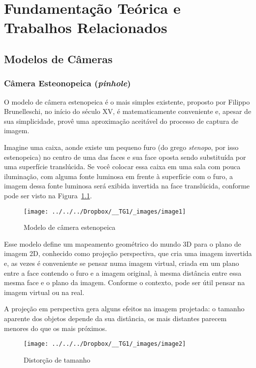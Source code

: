 \documentclass[ecp,tc]{iiufrgs}
\begin{document}
\chapter{Fundamentação Teórica e Trabalhos Relacionados}

\section{Modelos de Câmeras}

\subsection{Câmera Esteonopeica (\textit{pinhole})}
O  modelo  de  câmera  estenopeica  é  o  mais  simples  existente,  proposto  por  Filippo Brunelleschi, no início do século XV, é matematicamente conveniente e, apesar de sua simplicidade, provê uma aproximação aceitável do processo de captura de imagem.

Imagine uma caixa, aonde existe um pequeno furo (do grego \textit{stenopo}, por isso estenopeica) no centro de uma das faces e sua face oposta sendo substituída por uma superfície translúcida. Se você colocar essa caixa em uma sala com pouca iluminação, com alguma fonte luminosa em frente à superfície com o furo, a imagem dessa fonte luminosa será exibida invertida na face translúcida, conforme pode ser visto na Figura~\ref{fig:image1}.

\begin{figure}
\centering
\caption{Modelo de câmera estenopeica}
\texttt{[image: ../../../Dropbox/\_\_TG1/\_images/image1]}
\label{fig:image1}
\end{figure}

Esse modelo define um mapeamento geométrico do mundo 3D para o plano de imagem 2D, conhecido como projeção perspectiva, que cria uma imagem invertida e, as vezes é conveniente se pensar numa imagem virtual, criada em um plano entre a face contendo o furo e a imagem original, à mesma distância entre essa mesma face e o plano da imagem. Conforme o contexto, pode ser útil pensar na imagem virtual ou na real.

A projeção em perspectiva gera alguns efeitos na imagem projetada: o tamanho aparente dos objetos depende da sua distância, os mais distantes parecem menores do que os mais próximos.

\begin{figure}
	\centering
	\caption{Distorção de tamanho}
	\texttt{[image: ../../../Dropbox/\_\_TG1/\_images/image2]}
	\label{fig:image2}
\end{figure}
\end{document}
